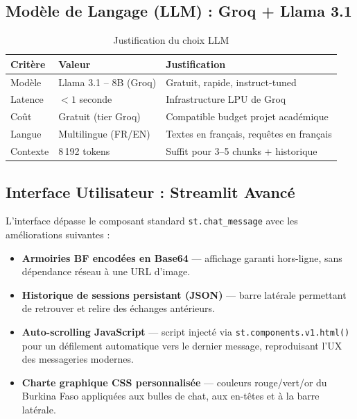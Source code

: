 \documentclass[12pt, a4paper]{article}
\begin{document}
\subsection{Modèle de Langage (LLM) : Groq + Llama 3.1}

\begin{table}[h!]
\centering
\renewcommand{\arraystretch}{1.4}
\begin{tabular}{@{}lll@{}}
\toprule
\textbf{Critère} & \textbf{Valeur} & \textbf{Justification} \\
\midrule
Modèle & Llama 3.1 – 8B (Groq) & Gratuit, rapide, instruct-tuned \\
Latence & $< 1$ seconde & Infrastructure LPU de Groq \\
Coût & Gratuit (tier Groq) & Compatible budget projet académique \\
Langue & Multilingue (FR/EN) & Textes en français, requêtes en français \\
Contexte & 8\,192 tokens & Suffit pour 3–5 chunks + historique \\
\bottomrule
\end{tabular}
\caption{Justification du choix LLM}
\end{table}


\subsection{Interface Utilisateur : Streamlit Avancé}

L'interface dépasse le composant standard \texttt{st.chat\_message} avec les améliorations suivantes :

\begin{itemize}[leftmargin=*]
  \item \textbf{Armoiries BF encodées en Base64} — affichage garanti hors-ligne, sans dépendance réseau à une URL d'image.
  \item \textbf{Historique de sessions persistant (JSON)} — barre latérale permettant de retrouver et relire des échanges antérieurs.
  \item \textbf{Auto-scrolling JavaScript} — script injecté via \texttt{st.components.v1.html()} pour un défilement automatique vers le dernier message, reproduisant l'UX des messageries modernes.
  \item \textbf{Charte graphique CSS personnalisée} — couleurs rouge/vert/or du Burkina Faso appliquées aux bulles de chat, aux en-têtes et à la barre latérale.
\end{itemize}
\end{document}
